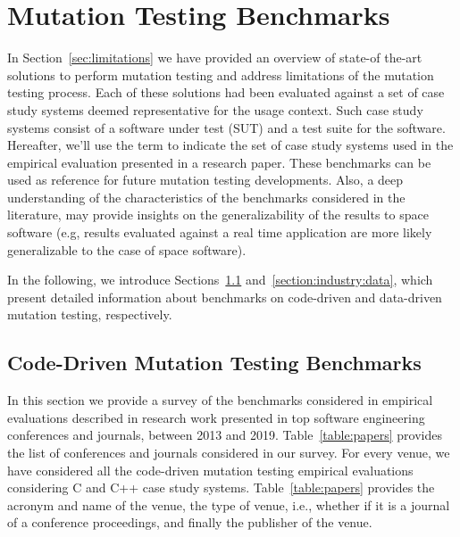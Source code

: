 
\chapter{Mutation Testing Benchmarks}
\label{chapter:industry}

In Section~\ref{sec:limitations} we have provided an overview of state-of the-art solutions to perform mutation testing and address limitations of the mutation testing process.
Each of these solutions had been evaluated against a set of case study systems deemed representative for the usage context. Such case study systems consist of a software under test (SUT) and a test suite for the software.
Hereafter, we'll use the term  to indicate the set of case study systems used in the empirical evaluation presented in a research paper.
These benchmarks can be used as reference for future mutation testing developments. 
Also, a deep understanding of the characteristics of the benchmarks considered in the literature, may provide insights on the generalizability of the results to space software (e.g, results evaluated against a real time application are more likely generalizable to the case of space software).

In the following, we introduce Sections~\ref{section:industry:code} and~\ref{section:industry:data}, which present detailed information about benchmarks on code-driven and data-driven mutation testing, respectively.


\section{Code-Driven Mutation Testing Benchmarks}
\label{section:industry:code}



In this section we provide a survey of the benchmarks considered in empirical evaluations described in research work presented in top software engineering conferences and journals, between 2013 and 2019. Table~\ref{table:papers} provides the list of conferences and journals considered in our survey. For every venue, we have considered all the code-driven mutation testing empirical evaluations considering C and C++ case study systems. Table~\ref{table:papers} provides the acronym and name of the venue, the type of venue, i.e., whether if it is a journal of a conference proceedings, and finally the publisher of the venue. 

